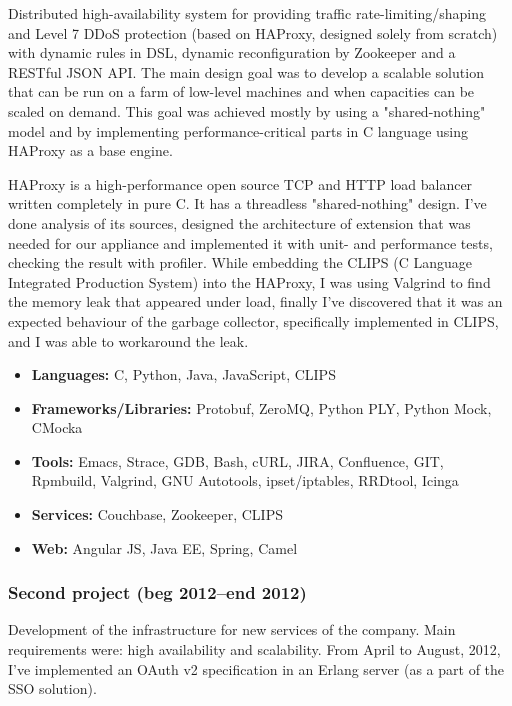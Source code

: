 Distributed high-availability system for providing traffic
rate-limiting/shaping and Level 7 DDoS protection (based on HAProxy,
designed solely from scratch) with dynamic rules in DSL, dynamic
reconfiguration by Zookeeper and a RESTful JSON API. The main design
goal was to develop a scalable solution that can be run on a farm of
low-level machines and when capacities can be scaled on demand. This
goal was achieved mostly by using a "shared-nothing" model and by
implementing performance-critical parts in C language using HAProxy as
a base engine.

HAProxy is a high-performance open source TCP and HTTP load balancer
written completely in pure C. It has a threadless "shared-nothing"
design.  I've done analysis of its sources, designed the architecture
of extension that was needed for our appliance and implemented it with
unit- and performance tests, checking the result with profiler. While
embedding the CLIPS (C Language Integrated Production System) into the
HAProxy, I was using Valgrind to find the memory leak that appeared
under load, finally I've discovered that it was an expected behaviour
of the garbage collector, specifically implemented in CLIPS, and I was
able to workaround the leak.

\begin{itemize}[noitemsep, nosep]
  \item \textbf{Languages:} C, Python, Java, JavaScript, CLIPS
  \item \textbf{Frameworks/Libraries:} Protobuf, ZeroMQ, Python PLY,
Python Mock, CMocka
  \item \textbf{Tools:} Emacs, Strace, GDB, Bash, cURL, JIRA,
Confluence, GIT, Rpmbuild, Valgrind, GNU Autotools, ipset/iptables,
RRDtool, Icinga
  \item \textbf{Services:} Couchbase, Zookeeper, CLIPS
  \item \textbf{Web:} Angular JS, Java EE, Spring, Camel
\end{itemize}

\subsubsection*{Second project (beg 2012--end 2012)}

Development of the infrastructure for new services of the
company. Main requirements were: high availability and
scalability. From April to August, 2012, I've implemented an OAuth v2
specification in an Erlang server (as a part of the SSO solution).


